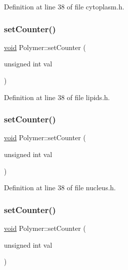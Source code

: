 Definition at line 38 of file cytoplasm.\+h.

\mbox{\label{class_polymer_a7ed6bbe09a570b59f9253d63fd3326d2}} 
\subsubsection{\texorpdfstring{set\+Counter()}{setCounter()}\hspace{0.1cm}{\footnotesize\ttfamily [5/10]}}
{\footnotesize\ttfamily \mbox{\hyperlink{glad_8h_a950fc91edb4504f62f1c577bf4727c29}{void}} Polymer\+::set\+Counter (\begin{DoxyParamCaption}\item[{unsigned int}]{val }\end{DoxyParamCaption})\hspace{0.3cm}{\ttfamily [inline]}}



Definition at line 38 of file lipids.\+h.

\mbox{\label{class_polymer_a7ed6bbe09a570b59f9253d63fd3326d2}} 
\subsubsection{\texorpdfstring{set\+Counter()}{setCounter()}\hspace{0.1cm}{\footnotesize\ttfamily [6/10]}}
{\footnotesize\ttfamily \mbox{\hyperlink{glad_8h_a950fc91edb4504f62f1c577bf4727c29}{void}} Polymer\+::set\+Counter (\begin{DoxyParamCaption}\item[{unsigned int}]{val }\end{DoxyParamCaption})\hspace{0.3cm}{\ttfamily [inline]}}



Definition at line 38 of file nucleus.\+h.

\mbox{\label{class_polymer_a7ed6bbe09a570b59f9253d63fd3326d2}} 
\subsubsection{\texorpdfstring{set\+Counter()}{setCounter()}\hspace{0.1cm}{\footnotesize\ttfamily [7/10]}}
{\footnotesize\ttfamily \mbox{\hyperlink{glad_8h_a950fc91edb4504f62f1c577bf4727c29}{void}} Polymer\+::set\+Counter (\begin{DoxyParamCaption}\item[{unsigned int}]{val }\end{DoxyParamCaption})\hspace{0.3cm}{\ttfamily [inline]}}



